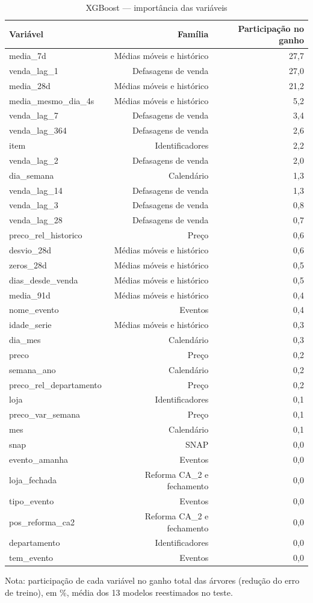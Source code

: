 \begin{table}[htbp]
\centering
\small
\caption{XGBoost — importância das variáveis}
\label{tab:xgb_importancia}
\begin{tabular}{lrr}
\toprule
Variável & Família & Participação no ganho \\
\midrule
media\_7d & Médias móveis e histórico & 27,7 \\
venda\_lag\_1 & Defasagens de venda & 27,0 \\
media\_28d & Médias móveis e histórico & 21,2 \\
media\_mesmo\_dia\_4s & Médias móveis e histórico & 5,2 \\
venda\_lag\_7 & Defasagens de venda & 3,4 \\
venda\_lag\_364 & Defasagens de venda & 2,6 \\
item & Identificadores & 2,2 \\
venda\_lag\_2 & Defasagens de venda & 2,0 \\
dia\_semana & Calendário & 1,3 \\
venda\_lag\_14 & Defasagens de venda & 1,3 \\
venda\_lag\_3 & Defasagens de venda & 0,8 \\
venda\_lag\_28 & Defasagens de venda & 0,7 \\
preco\_rel\_historico & Preço & 0,6 \\
desvio\_28d & Médias móveis e histórico & 0,6 \\
zeros\_28d & Médias móveis e histórico & 0,5 \\
dias\_desde\_venda & Médias móveis e histórico & 0,5 \\
media\_91d & Médias móveis e histórico & 0,4 \\
nome\_evento & Eventos & 0,4 \\
idade\_serie & Médias móveis e histórico & 0,3 \\
dia\_mes & Calendário & 0,3 \\
preco & Preço & 0,2 \\
semana\_ano & Calendário & 0,2 \\
preco\_rel\_departamento & Preço & 0,2 \\
loja & Identificadores & 0,1 \\
preco\_var\_semana & Preço & 0,1 \\
mes & Calendário & 0,1 \\
snap & SNAP & 0,0 \\
evento\_amanha & Eventos & 0,0 \\
loja\_fechada & Reforma CA\_2 e fechamento & 0,0 \\
tipo\_evento & Eventos & 0,0 \\
pos\_reforma\_ca2 & Reforma CA\_2 e fechamento & 0,0 \\
departamento & Identificadores & 0,0 \\
tem\_evento & Eventos & 0,0 \\
\bottomrule
\end{tabular}
\par\smallskip
{\footnotesize Nota: participação de cada variável no ganho total das árvores (redução do erro de treino), em \%, média dos 13 modelos reestimados no teste.}
\end{table}
